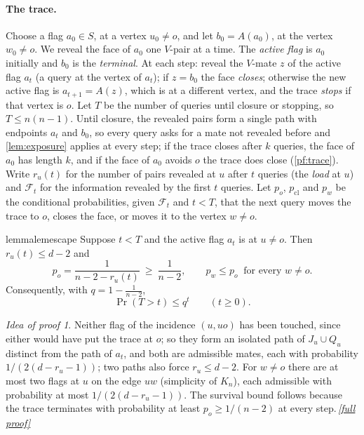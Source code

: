 \documentclass[11pt,a4paper]{article}
\theoremstyle{plain}
\theoremstyle{definition}
\theoremstyle{remark}
\newtheorem*{proofidea}{Idea of proof}
\newcommand{\fullproofref}[1]{\,\hyperref[#1]{\textit{[full proof]}}}
\newcommand{\cF}{\mathcal F}
\begin{document}
\paragraph{The trace.}
Choose a flag $a_0\in S$, at a vertex $u_0\ne o$, and let $b_0=A(a_0)$, at the vertex $w_0\ne o$. We reveal the face of $a_0$ one $V$-pair at a time. The \emph{active flag} is $a_0$ initially and $b_0$ is the \emph{terminal}. At each step: reveal the $V$-mate $z$ of the active flag $a_t$ (a query at the vertex of $a_t$); if $z=b_0$ the face \emph{closes}; otherwise the new active flag is $a_{t+1}=A(z)$, which is at a different vertex, and the trace \emph{stops} if that vertex is $o$. Let $T$ be the number of queries until closure or stopping, so $T\le n(n-1)$. Until closure, the revealed pairs form a single path with endpoints $a_t$ and $b_0$, so every query asks for a mate not revealed before and \cref{lem:exposure} applies at every step; if the trace closes after $k$ queries, the face of $a_0$ has length $k$, and if the face of $a_0$ avoids $o$ the trace does close (\cref{pf:trace}). Write $r_u(t)$ for the number of pairs revealed at $u$ after $t$ queries (the \emph{load} at $u$) and $\cF_t$ for the information revealed by the first $t$ queries. Let $p_o$, $p_{\mathrm{cl}}$ and $p_w$ be the conditional probabilities, given $\cF_t$ and $t<T$, that the next query moves the trace to $o$, closes the face, or moves it to the vertex $w\ne o$.

\begin{restatable}{lemma}{lemescape}\label{lem:escape}
Suppose $t<T$ and the active flag $a_t$ is at $u\ne o$. Then $r_u(t)\le d-2$ and
\begin{equation}\label{eq:po}
p_o=\frac{1}{n-2-r_u(t)}\ \ge\ \frac1{n-2},\qquad p_w\le p_o\ \text{ for every } w\ne o .
\end{equation}
Consequently, with $q=1-\frac1{n-2}$,
\begin{equation}\label{eq:survival}
\Pr(T>t)\le q^t\qquad(t\ge0).
\end{equation}
\end{restatable}
\begin{proofidea}
Neither flag of the incidence $(u,uo)$ has been touched, since either would have put the trace at $o$; so they form an isolated path of $J_u\cup Q_u$ distinct from the path of $a_t$, and both are admissible mates, each with probability $1/(2(d-r_u-1))$; two paths also force $r_u\le d-2$. For $w\ne o$ there are at most two flags at $u$ on the edge $uw$ (simplicity of $K_n$), each admissible with probability at most $1/(2(d-r_u-1))$. The survival bound follows because the trace terminates with probability at least $p_o\ge1/(n-2)$ at every step.\fullproofref{pf:escape}
\end{proofidea}
\end{document}
